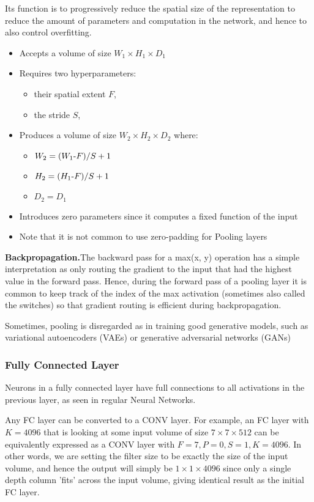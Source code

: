 \documentclass[letterpaper]{article}
\begin{document}
Its function is to progressively reduce the spatial size of the representation to reduce the amount of parameters and computation in the network, and hence to also control overfitting.

\begin{itemize}
	\item Accepts a volume of size \(W_1 \times H_1 \times D_1\)
	\item Requires two hyperparameters:
		\begin{itemize}
			\item their spatial extent \(F\),
			\item the stride \(S\),
		\end{itemize}
	\item Produces a volume of size \(W_2 \times H_2 \times D_2\) where:
		\begin{itemize}
			\item \(W_2 = (W_1 $-$ F)/S+1\)
			\item \(H_2 = (H_1 $-$ F)/S+1\)
			\item \(D_2 = D_1\)
		\end{itemize}
	\item Introduces zero parameters since it computes a fixed function of the input
	\item Note that it is not common to use zero-padding for Pooling layers
\end{itemize}


\textbf{Backpropagation.}The backward pass for a max(x, y) operation has a simple interpretation as only routing the gradient to the input that had the highest value in the forward pass. Hence, during the forward pass of a pooling layer it is common to keep track of the index of the max activation (sometimes also called the switches) so that gradient routing is efficient during backpropagation.

Sometimes, pooling is disregarded as in training good generative models, such as variational autoencoders (VAEs) or generative adversarial networks (GANs)

\subsubsection{Fully Connected Layer}

Neurons in a fully connected layer have full connections to all activations in the previous layer, as seen in regular Neural Networks. 

Any FC layer can be converted to a CONV layer. For example, an FC layer with \(K=4096\) that is looking at some input volume of size \(7 \times 7 \times 512\) can be equivalently expressed as a CONV layer with \(F=7,P=0,S=1,K=4096\). In other words, we are setting the filter size to be exactly the size of the input volume, and hence the output will simply be \(1 \times 1 \times 4096\) since only a single depth column 'fits' across the input volume, giving identical result as the initial FC layer.
\end{document}
